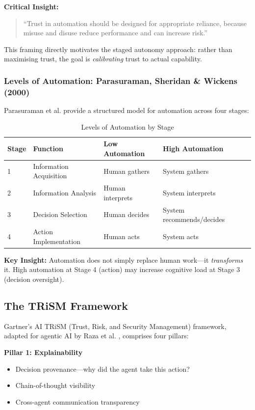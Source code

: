 \textbf{Critical Insight:}
\begin{quote}
``Trust in automation should be designed for appropriate reliance, because misuse and disuse reduce performance and can increase risk.''
\end{quote}

This framing directly motivates the staged autonomy approach: rather than maximising trust, the goal is \textit{calibrating} trust to actual capability.

\subsubsection{Levels of Automation: Parasuraman, Sheridan \& Wickens (2000)}

Parasuraman et al. \citep{parasuraman2000} provide a structured model for automation across four stages:

\begin{table}[htbp]
\centering
\caption{Levels of Automation by Stage}
\label{tab:loa-stages}
\begin{tabular}{lllll}
\toprule
\textbf{Stage} & \textbf{Function} & \textbf{Low Automation} & \textbf{High Automation} \\
\midrule
1 & Information Acquisition & Human gathers & System gathers \\
2 & Information Analysis & Human interprets & System interprets \\
3 & Decision Selection & Human decides & System recommends/decides \\
4 & Action Implementation & Human acts & System acts \\
\bottomrule
\end{tabular}
\end{table}

\textbf{Key Insight:} Automation does not simply replace human work---it \textit{transforms} it. High automation at Stage 4 (action) may increase cognitive load at Stage 3 (decision oversight).

\subsection{The TRiSM Framework}
\label{subsec:trism}

Gartner's AI TRiSM (Trust, Risk, and Security Management) framework, adapted for agentic AI by Raza et al. \citep{raza2025}, comprises four pillars:

\textbf{Pillar 1: Explainability}
\begin{itemize}
    \item Decision provenance---why did the agent take this action?
    \item Chain-of-thought visibility
    \item Cross-agent communication transparency
\end{itemize}


